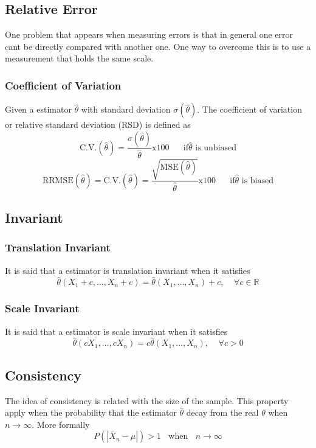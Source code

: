 \subsection{Relative Error}
One problem that appears when measuring errors is that in general one error cant
be directly compared with another one. One way to overcome this is to use a
measurement that holds the same scale.
\subsubsection{Coefficient of Variation}
Given a estimator $\hat{\theta}$ with standard deviation $\sigma(\hat{\theta})$.
The coefficient of variation or relative standard deviation (RSD) is defined as
\[ \text{C.V.}(\hat{\theta}) =
\frac{\sigma(\hat{\theta})}{\hat{\theta}}\text{x}100\;\;\;\;\;\;
\text{if}\hat{\theta} \text{ is unbiased}\]
\[
\text{RRMSE}(\hat{\theta}) = \text{C.V.}(\hat{\theta}) = 
\frac{\sqrt{\text{MSE}(\hat{\theta})}}{\hat{\theta}}\text{x}100\;\;\;\;\;\; \text{if
}\hat{\theta} \text{ is biased}
 \] 

\subsection{Invariant}
\subsubsection{Translation Invariant}
It is said that a estimator is translation invariant when it satisfies
\[ \hat{\theta}(X_1 + c,\dots,X_n + c) = \hat{\theta}(X_1,\dots,X_n) +
c,\;\;\;\; \forall c \in \mathbb{R}\]

\subsubsection{Scale Invariant}
It is said that a estimator is scale invariant when it satisfies
\[ \hat{\theta}(cX_1,\dots,cX_n) = c\hat{\theta}(X_1,\dots,X_n) ,\;\;\;\;
\forall c > 0 \]

\subsection{Consistency}
The idea of consistency is related with the size of the sample. This property
apply when the probability that the estimator $\hat{\theta}$ decay from the real
$\theta$ when $n\rightarrow\infty$. More formally 
\[ P(|\bar{X}_n - \mu|) > 1 \;\;\text{ when }\;\; n\rightarrow\infty\]


